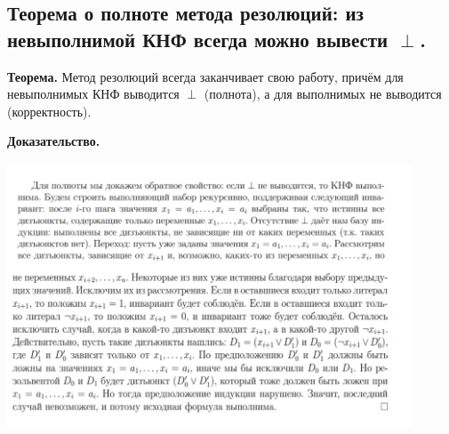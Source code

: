 \subsection{Теорема о полноте метода резолюций: из невыполнимой КНФ всегда можно вывести $\perp$.}

\textbf{Теорема.} Метод резолюций всегда заканчивает свою работу, причём для невыполнимых КНФ выводится $\perp$ (полнота), а для выполнимых не выводится (корректность).

\textbf{Доказательство.}

\includegraphics[width=0.9\textwidth]{images/1.4}